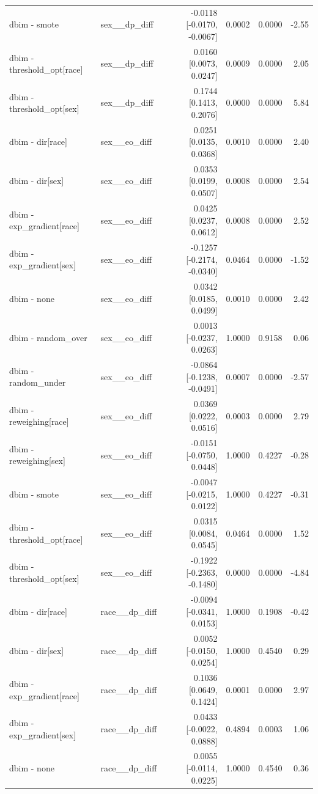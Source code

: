 \begin{table}[t]
{\begin{tabular}{llrrrr}
dbim - smote & sex\_\_dp\_diff & -0.0118 [-0.0170, -0.0067] & 0.0002 & 0.0000 & -2.55 \\
dbim - threshold\_opt[race] & sex\_\_dp\_diff & 0.0160 [0.0073, 0.0247] & 0.0009 & 0.0000 & 2.05 \\
dbim - threshold\_opt[sex] & sex\_\_dp\_diff & 0.1744 [0.1413, 0.2076] & 0.0000 & 0.0000 & 5.84 \\
dbim - dir[race] & sex\_\_eo\_diff & 0.0251 [0.0135, 0.0368] & 0.0010 & 0.0000 & 2.40 \\
dbim - dir[sex] & sex\_\_eo\_diff & 0.0353 [0.0199, 0.0507] & 0.0008 & 0.0000 & 2.54 \\
dbim - exp\_gradient[race] & sex\_\_eo\_diff & 0.0425 [0.0237, 0.0612] & 0.0008 & 0.0000 & 2.52 \\
dbim - exp\_gradient[sex] & sex\_\_eo\_diff & -0.1257 [-0.2174, -0.0340] & 0.0464 & 0.0000 & -1.52 \\
dbim - none & sex\_\_eo\_diff & 0.0342 [0.0185, 0.0499] & 0.0010 & 0.0000 & 2.42 \\
dbim - random\_over & sex\_\_eo\_diff & 0.0013 [-0.0237, 0.0263] & 1.0000 & 0.9158 & 0.06 \\
dbim - random\_under & sex\_\_eo\_diff & -0.0864 [-0.1238, -0.0491] & 0.0007 & 0.0000 & -2.57 \\
dbim - reweighing[race] & sex\_\_eo\_diff & 0.0369 [0.0222, 0.0516] & 0.0003 & 0.0000 & 2.79 \\
dbim - reweighing[sex] & sex\_\_eo\_diff & -0.0151 [-0.0750, 0.0448] & 1.0000 & 0.4227 & -0.28 \\
dbim - smote & sex\_\_eo\_diff & -0.0047 [-0.0215, 0.0122] & 1.0000 & 0.4227 & -0.31 \\
dbim - threshold\_opt[race] & sex\_\_eo\_diff & 0.0315 [0.0084, 0.0545] & 0.0464 & 0.0000 & 1.52 \\
dbim - threshold\_opt[sex] & sex\_\_eo\_diff & -0.1922 [-0.2363, -0.1480] & 0.0000 & 0.0000 & -4.84 \\
dbim - dir[race] & race\_\_dp\_diff & -0.0094 [-0.0341, 0.0153] & 1.0000 & 0.1908 & -0.42 \\
dbim - dir[sex] & race\_\_dp\_diff & 0.0052 [-0.0150, 0.0254] & 1.0000 & 0.4540 & 0.29 \\
dbim - exp\_gradient[race] & race\_\_dp\_diff & 0.1036 [0.0649, 0.1424] & 0.0001 & 0.0000 & 2.97 \\
dbim - exp\_gradient[sex] & race\_\_dp\_diff & 0.0433 [-0.0022, 0.0888] & 0.4894 & 0.0003 & 1.06 \\
dbim - none & race\_\_dp\_diff & 0.0055 [-0.0114, 0.0225] & 1.0000 & 0.4540 & 0.36 \\

\end{tabular}}
\end{table}
